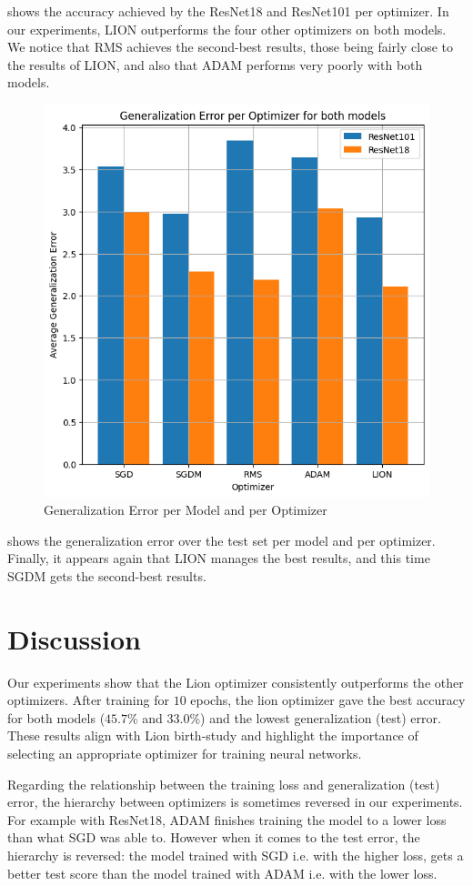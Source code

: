 \documentclass[10pt,conference,compsocconf]{IEEEtran}
\begin{document}
 shows the accuracy achieved by the ResNet18 and ResNet101 per optimizer. In our experiments, LION outperforms the four other optimizers on both models. We notice that RMS achieves the second-best results, those being fairly close to the results of LION, and also that ADAM performs very poorly with both models.

\begin{figure}[htbp]
  \centering
  \includegraphics[width=0.8\columnwidth]{gen}
  \caption{Generalization Error per Model and per Optimizer}
  \vspace{-3mm}
  \label{gen}
\end{figure}

 shows the generalization error over the test set per model and per optimizer. Finally, it appears again that LION manages the best results, and this time SGDM gets the second-best results.

\section{Discussion}
Our experiments show that the Lion optimizer consistently outperforms the other optimizers. After training for $10$ epochs, the lion optimizer gave the best accuracy for both models ($45.7$\% and $33.0$\%) and the lowest generalization (test) error. These results align with Lion birth-study \cite{lion-study} and highlight the importance of selecting an appropriate optimizer for training neural networks. 

Regarding the relationship between the training loss and generalization (test) error, the hierarchy between optimizers is sometimes reversed in our experiments. For example with ResNet18, ADAM finishes training the model to a lower loss than what SGD was able to. However when it comes to the test error, the hierarchy is reversed: the model trained with SGD i.e. with the higher loss, gets a better test score than the model trained with ADAM i.e. with the lower loss. 
\end{document}
